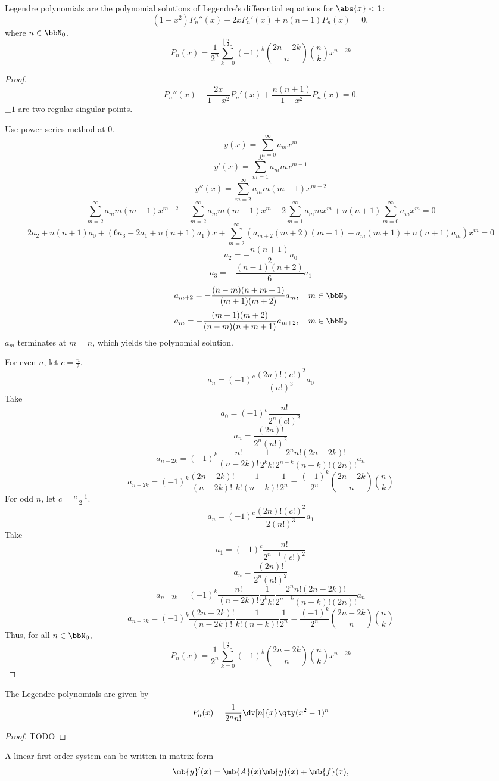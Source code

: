 \documentclass[a4paper,12pt]{report}
\begin{document}
\epr
{}
Legendre polynomials are the polynomial solutions of Legendre's differential equations for $\abs{x}<1$:
\[(1-x^2)P_n''(x)-2xP_n'(x)+n(n+1)P_n(x)=0,\]
where $n\in\bbN_0$.
\[P_n(x)=\frac{1}{2^n}\sum_{k=0}^{\left\lfloor\frac{n}{2}\right\rfloor}(-1)^k\binom{2n-2k}{n}\binom{n}{k}x^{n-2k}\]
\begin{proof}
\[P_n''(x)-\frac{2x}{1-x^2}P_n'(x)+\frac{n(n+1)}{1-x^2}P_n(x)=0.\]
\(\pm 1\) are two regular singular points.

Use power series method at $0$.
\[y(x)=\sum_{m=0}^{\infty}a_mx^m\]
\[y'(x)=\sum_{m=1}^{\infty}a_mmx^{m-1}\]
\[y''(x)=\sum_{m=2}^{\infty}a_mm(m-1)x^{m-2}\]
\[\sum_{m=2}^{\infty}a_mm(m-1)x^{m-2}-\sum_{m=2}^{\infty}a_mm(m-1)x^m-2\sum_{m=1}^{\infty}a_mmx^m+n(n+1)\sum_{m=0}^{\infty}a_mx^m=0\]
\[2a_2+n(n+1)a_0+(6a_3-2a_1+n(n+1)a_1)x+\sum_{m=2}^{\infty}(a_{m+2}(m+2)(m+1)-a_m(m+1)+n(n+1)a_m)x^m=0\]
\[a_2=-\frac{n(n+1)}{2}a_0\]
\[a_3=-\frac{(n-1)(n+2)}{6}a_1\]
\[a_{m+2}=-\frac{(n-m)(n+m+1)}{(m+1)(m+2)}a_m,\quad m\in\bbN_0\]
\[a_m=-\frac{(m+1)(m+2)}{(n-m)(n+m+1)}a_{m+2},\quad m\in\bbN_0\]
$a_m$ terminates at $m=n$, which yields the polynomial solution.

For even $n$, let $c=\frac{n}{2}$.
\[a_n=(-1)^c\frac{(2n)!(c!)^2}{(n!)^3}a_0\]
Take
\[a_0=(-1)^c\frac{n!}{2^n(c!)^2}\]
\[a_n=\frac{(2n)!}{2^n(n!)^2}\]
\[a_{n-2k}=(-1)^k\frac{n!}{(n-2k)!}\frac{1}{2^kk!}\frac{2^nn!(2n-2k)!}{2^{n-k}(n-k)!(2n)!}a_n\]
\[a_{n-2k}=(-1)^k\frac{(2n-2k)!}{(n-2k)!}\frac{1}{k!(n-k)!}\frac{1}{2^n}=\frac{(-1)^k}{2^n}\binom{2n-2k}{n}\binom{n}{k}\]
For odd $n$, let $c=\frac{n-1}{2}$.
\[a_n=(-1)^c\frac{(2n)!(c!)^2}{2(n!)^3}a_1\]
Take
\[a_1=(-1)^c\frac{n!}{2^{n-1}(c!)^2}\]
\[a_n=\frac{(2n)!}{2^n(n!)^2}\]
\[a_{n-2k}=(-1)^k\frac{n!}{(n-2k)!}\frac{1}{2^kk!}\frac{2^nn!(2n-2k)!}{2^{n-k}(n-k)!(2n)!}a_n\]
\[a_{n-2k}=(-1)^k\frac{(2n-2k)!}{(n-2k)!}\frac{1}{k!(n-k)!}\frac{1}{2^n}=\frac{(-1)^k}{2^n}\binom{2n-2k}{n}\binom{n}{k}\]
Thus, for all $n\in\bbN_0$,
\[P_n(x)=\frac{1}{2^n}\sum_{k=0}^{\left\lfloor\frac{n}{2}\right\rfloor}(-1)^k\binom{2n-2k}{n}\binom{n}{k}x^{n-2k}\]
\end{proof}
The Legendre polynomials are given by
\[P_n(x)=\frac{1}{2^nn!}\dv[n]{x}\qty(x^2-1)^n\]
\begin{proof}
TODO 
\end{proof}
A linear first-order system can be written in matrix form
\[\mb{y}'(x)=\mb{A}(x)\mb{y}(x)+\mb{f}(x),\]
\end{document}
